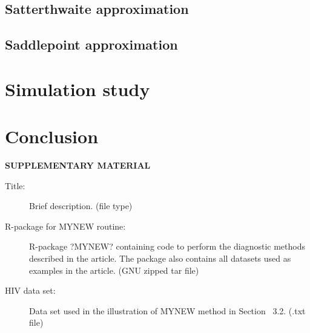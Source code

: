 \documentclass[12pt]{article}\usepackage[]{graphicx}\usepackage[]{color}
\begin{document}
\citet{Kauermann2001note}

\subsection{Satterthwaite approximation} 

\citet{Lipsitz1999degrees}

\subsection{Saddlepoint approximation}

\citet{McCaffrey2006improved}

\section{Simulation study}
\label{sec:verify}

\section{Conclusion}
\label{sec:conc}


\newpage
\begin{center}
{\large\bf SUPPLEMENTARY MATERIAL}
\end{center}

\begin{description}

\item[Title:] Brief description. (file type)

\item[R-package for  MYNEW routine:] R-package ?MYNEW? containing code to perform the diagnostic methods described in the article. The package also contains all datasets used as examples in the article. (GNU zipped tar file)

\item[HIV data set:] Data set used in the illustration of MYNEW method in Section~ 3.2. (.txt file)

\end{description}



\end{document}
